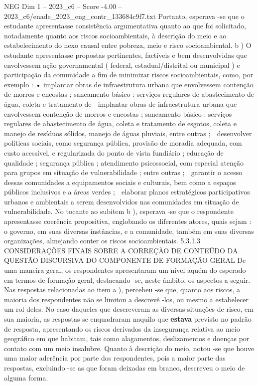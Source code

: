 \begin{textsample}{NEG Dim 1 – 2023\_c6 – Score -4.00 – 2023\_c6/enade\_2023\_eng\_contr\_133684c9f7.txt}
Portanto, esperava -se que o estudante apresentasse consistência argumentativa quanto ao que foi solicitado, notadamente quanto aos riscos socioambientais, à descrição do meio e ao estabelecimento do nexo causal entre pobreza, meio e risco socioambiental. b ) O estudante apresentasse propostas pertinentes, factíveis e bem desenvolvidas que envolvessem ação governamental ( federal, estadual/distrital ou municipal ) e participação da comunidade a fim de minimizar riscos socioambientais, como, por exemplo : • implantar obras de infraestrutura urbana que envolvessem contenção de morros e encostas ; saneamento básico : serviços regulares de abastecimento de água, coleta e tratamento de  implantar obras de infraestrutura urbana que envolvessem contenção de morros e encostas ; saneamento básico : serviços regulares de abastecimento de água, coleta e tratamento de esgotos, coleta e manejo de resíduos sólidos, manejo de águas pluviais, entre outras ;  desenvolver políticas sociais, como segurança pública, provisão de moradia adequada, com custo acessível, e regularizada do ponto de vista fundiário ; educação de qualidade ; segurança pública ; atendimento psicossocial, com especial atenção para grupos em situação de vulnerabilidade ; entre outras ;  garantir o acesso dessas comunidades a equipamentos sociais e culturais, bem como a espaços públicos inclusivos e a áreas verdes ;  elaborar planos estratégicos participativos urbanos e ambientais a serem desenvolvidos nas comunidades em situação de vulnerabilidade.
No tocante ao subitem b ), esperava -se que o respondente apresentasse coerência propositiva, englobando os diferentes atores, quais sejam : o governo, em suas diversas instâncias, e a comunidade, também em suas diversas organizações, almejando conter os riscos socioambientais. 5.3.1.3 CONSIDERAÇÕES FINAIS SOBRE A CORREÇÃO DE CONTEÚDO DA QUESTÃO DISCURSIVA DO COMPONENTE DE FORMAÇÃO GERAL De uma maneira geral, os respondentes apresentaram um nível aquém do esperado em termos de formação geral, destacando -se, neste âmbito, os aspectos a seguir.
Nas respostas relacionadas ao item a ), percebeu -se que, quanto aos riscos, a maioria dos respondentes não se limitou a descrevê -los, ou mesmo a estabelecer um rol deles.
No caso daqueles que descreveram as diversas situações de risco, em sua maioria, as respostas se enquadraram naquilo que \textbf{estava} previsto no padrão de resposta, apresentando os riscos derivados da insegurança relativa ao meio geográfico em que habitam, tais como alagamentos, deslizamentos e doenças por contato com um meio insalubre.
Quanto à descrição do meio, notou -se que houve uma maior aderência por parte dos respondentes, pois a maior parte das respostas, excluindo -se as que foram deixadas em branco, descreveu o meio de alguma forma.

\end{textsample}
